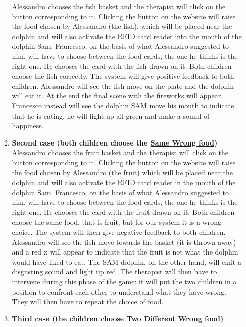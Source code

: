 \documentclass [12pt]{article}
\begin{document}
\begin{enumerate}
\begin{enumerate}
Alessandro chooses the fish basket and the therapist will click on the button corresponding to it. Clicking the button on the website will raise the food chosen by Alessandro (the fish), which will be placed near the dolphin and will also activate the RFID card reader into the mouth of the dolphin Sam. Francesco, on the basis of what Alessandro suggested to him, will have to choose between the food cards, the one he thinks is the right one.  He chooses the card with the fish drawn on it. Both children choose the fish correctly. The system will give positive feedback to both children. Alessandro will see the fish move on the plate and the dolphin will eat it. At the end the final scene with the fireworks will appear.  Francesco instead will see the dolphin SAM move his mouth to indicate that he is eating, he will light up all green and make a sound of happiness. 
\item  \textbf{Second case (both children choose the \underline{Same Wrong food})}\\
Alessandro chooses the fruit basket and the therapist will click on the button corresponding to it. Clicking the button on the website will raise the food chosen by Alessandro (the fruit) which will be placed near the dolphin and will also activate the RFID card reader in the mouth of the dolphin Sam.  Francesco, on the basis of what Alessandro suggested to him, will have to choose between the food cards, the one he thinks is the right one.  He chooses the card with the fruit drawn on it. Both children choose the same food, that is fruit, but for our system it is a wrong choice. The system will then give negative feedback to both children. Alessandro will see the fish move towards the basket (it is thrown away) and a red x will appear to indicate that the fruit is not what the dolphin would have liked to eat. The SAM dolphin, on the other hand, will emit a disgusting sound and light up red. The therapist will then have to intervene during this phase of the game: it will put the two children in a position to confront each other to understand what they have wrong. They will then have to repeat the choice of food.  
\item \textbf{Third case (the children choose \underline{Two Different Wrong food})}\\

\end{enumerate}
\end{enumerate}
\end{document}
